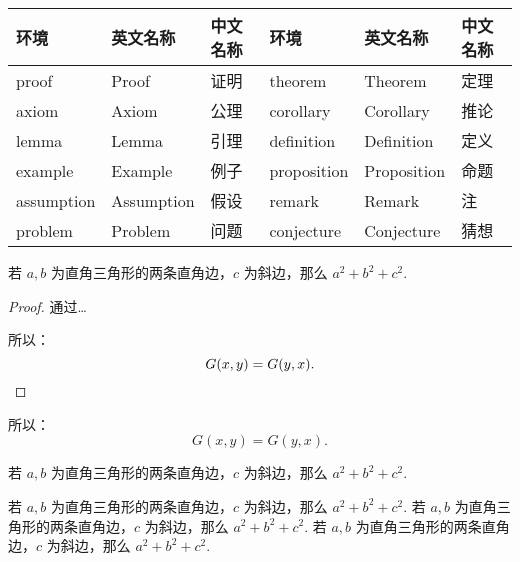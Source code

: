 \begin{table}[H]
  \begin{tabularx}{\textwidth}{YYY|YYY}
  \toprule
    环境 & 英文名称 & 中文名称 & 环境 & 英文名称 & 中文名称 \\
  \midrule
    proof & Proof & 证明 & theorem & Theorem & 定理 \\
    axiom & Axiom & 公理 & corollary & Corollary & 推论 \\
    lemma & Lemma & 引理 & definition & Definition & 定义 \\
    example & Example & 例子 & proposition & Proposition & 命题 \\
    assumption & Assumption & 假设 & remark & Remark & 注 \\
    problem & Problem & 问题 & conjecture & Conjecture & 猜想 \\
  \bottomrule
  \end{tabularx}
\end{table}


\begin{texcode}[]{}
  \begin{theorem}[勾股定理]
    若 $a,b$ 为直角三角形的两条直角边，$c$ 为斜边，那么 $a^2 + b^2 + c^2.$
  \end{theorem}

  \begin{proof}
    通过\ldots

    所以：
    \begin{equation*}
        G(x, y) = G(y, x).  \qedhere
    \end{equation*}
  \end{proof}
\end{texcode}

\begin{proposition}
  所以：
  \begin{equation*}
      G(x, y) = G(y, x).
  \end{equation*}
\end{proposition}

\begin{conjecture}[勾股定理]
    若 $a,b$ 为直角三角形的两条直角边，$c$ 为斜边，那么 $a^2 + b^2 + c^2.$
\end{conjecture}

\begin{axiom}[勾股定理]
    若 $a,b$ 为直角三角形的两条直角边，$c$ 为斜边，那么 $a^2 + b^2 + c^2.$ 若 $a,b$ 为直角三角形的两条直角边，$c$ 为斜边，那么 $a^2 + b^2 + c^2.$ 若 $a,b$ 为直角三角形的两条直角边，$c$ 为斜边，那么 $a^2 + b^2 + c^2.$
\end{axiom}

